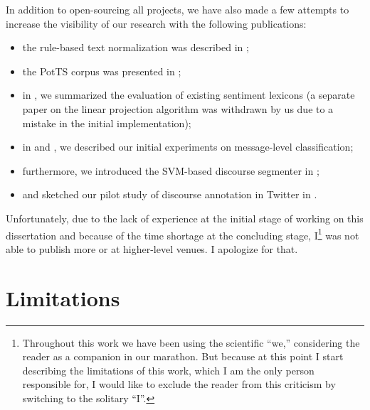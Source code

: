 In addition to open-sourcing all projects, we have also made a few
attempts to increase the visibility of our research with the following
publications:
\begin{itemize}
  \item the rule-based text normalization was described in
    \cite{Sidarenka:13};
  \item the PotTS corpus was presented in \cite{Sidarenka:16};
  \item in \cite{Sidarenka:16b}, we summarized the evaluation of
    existing sentiment lexicons (a separate paper on the linear
    projection algorithm was withdrawn by us due to a mistake in the
    initial implementation);
  \item in \cite{Sidarenka:16a} and \cite{Sidarenka:17}, we described
    our initial experiments on message-level classification;
  \item furthermore, we introduced the SVM-based discourse segmenter
    in \cite{Sidarenka:15};
  \item and sketched our pilot study of discourse annotation in
    Twitter in \cite{Sidarenka:15a}.
\end{itemize}
Unfortunately, due to the lack of experience at the initial stage of
working on this dissertation and because of the time shortage at the
concluding stage, I\footnote{Throughout this work we have been using
  the scientific ``we,'' considering the reader as a companion in our
  marathon.  But because at this point I start describing the
  limitations of this work, which I am the only person responsible
  for, I would like to exclude the reader from this criticism by
  switching to the solitary ``I''.} was not able to publish more or at
higher-level venues.  I apologize for that.


\section*{Limitations}

